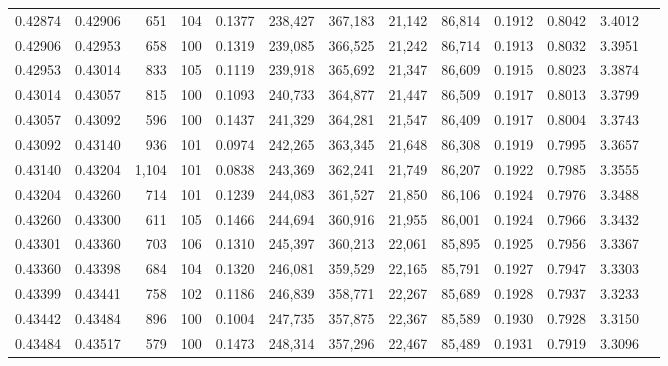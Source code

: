 \begin{tabular}{rrrrrrrrrrrrr}
0.42874 & 0.42906 &   651 & 104 &                                     0.1377 & 238,427 & 367,183 &  21,142 &  86,814 & 0.1912 & 0.8042 & 3.4012 \\
0.42906 & 0.42953 &   658 & 100 &                                     0.1319 & 239,085 & 366,525 &  21,242 &  86,714 & 0.1913 & 0.8032 & 3.3951 \\
0.42953 & 0.43014 &   833 & 105 &                                     0.1119 & 239,918 & 365,692 &  21,347 &  86,609 & 0.1915 & 0.8023 & 3.3874 \\
0.43014 & 0.43057 &   815 & 100 &                                     0.1093 & 240,733 & 364,877 &  21,447 &  86,509 & 0.1917 & 0.8013 & 3.3799 \\
0.43057 & 0.43092 &   596 & 100 &                                     0.1437 & 241,329 & 364,281 &  21,547 &  86,409 & 0.1917 & 0.8004 & 3.3743 \\
0.43092 & 0.43140 &   936 & 101 &                                     0.0974 & 242,265 & 363,345 &  21,648 &  86,308 & 0.1919 & 0.7995 & 3.3657 \\
0.43140 & 0.43204 & 1,104 & 101 &                                     0.0838 & 243,369 & 362,241 &  21,749 &  86,207 & 0.1922 & 0.7985 & 3.3555 \\
0.43204 & 0.43260 &   714 & 101 &                                     0.1239 & 244,083 & 361,527 &  21,850 &  86,106 & 0.1924 & 0.7976 & 3.3488 \\
0.43260 & 0.43300 &   611 & 105 &                                     0.1466 & 244,694 & 360,916 &  21,955 &  86,001 & 0.1924 & 0.7966 & 3.3432 \\
0.43301 & 0.43360 &   703 & 106 &                                     0.1310 & 245,397 & 360,213 &  22,061 &  85,895 & 0.1925 & 0.7956 & 3.3367 \\
0.43360 & 0.43398 &   684 & 104 &                                     0.1320 & 246,081 & 359,529 &  22,165 &  85,791 & 0.1927 & 0.7947 & 3.3303 \\
0.43399 & 0.43441 &   758 & 102 &                                     0.1186 & 246,839 & 358,771 &  22,267 &  85,689 & 0.1928 & 0.7937 & 3.3233 \\
0.43442 & 0.43484 &   896 & 100 &                                     0.1004 & 247,735 & 357,875 &  22,367 &  85,589 & 0.1930 & 0.7928 & 3.3150 \\
0.43484 & 0.43517 &   579 & 100 &                                     0.1473 & 248,314 & 357,296 &  22,467 &  85,489 & 0.1931 & 0.7919 & 3.3096 \\

\end{tabular}
